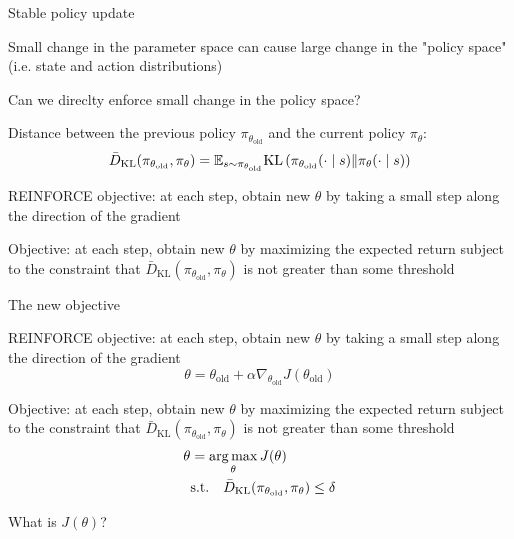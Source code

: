 \documentclass[usenames,dvipsnames,notes,11pt,aspectratio=169,hyperref={colorlinks=true, linkcolor=blue}]{beamer}
\begin{document}
\begin{frame}
    {Stable policy update}
    \begin{wideitemize}[<+->]
        \item Small change in the parameter space can cause large change in the "policy space" (i.e. state and action distributions)
        \item Can we direclty enforce small change in the policy space?
        \item Distance between the previous policy $\pi_{\theta_{\text{old}}}$ and the current policy $\pi_\theta$:
            $$
            \bar{D}_{\text{KL}}(\pi_{\theta_\text{old}}, \pi_\theta) =
            \mathbb{E}_{s\sim \pi_{\theta_\text{old}}}\text{KL}\left( \pi_{\theta_\text{old}}(\cdot\mid s) \| \pi_{\theta}(\cdot\mid s) \right)
            $$
        \item REINFORCE objective: at each step, obtain new $\theta$ by taking a small step along the direction of the gradient
        \item Objective: at each step, obtain new $\theta$ by maximizing the expected return subject to the constraint that $\bar{D}_{\text{KL}}(\pi_{\theta_\text{old}}, \pi_\theta)$ is not greater than some threshold
    \end{wideitemize}
\end{frame}

\begin{frame}
    {The new objective}
    \begin{wideitemize}[<+->]
        \item REINFORCE objective: at each step, obtain new $\theta$ by taking a small step along the direction of the gradient
            $$
            \theta = \theta_{\text{old}} + \alpha \nabla_{\theta_{\text{old}}} J(\theta_{\text{old}})
            $$
        \item Objective: at each step, obtain new $\theta$ by maximizing the expected return subject to the constraint that $\bar{D}_{\text{KL}}(\pi_{\theta_\text{old}}, \pi_\theta)$ is not greater than some threshold
            \begin{align*}
            \theta &= \operatorname*{arg\,max}_\theta J(\theta) \\
                &\text{s.t.} \quad \bar{D}_{\text{KL}}(\pi_{\theta_\text{old}}, \pi_\theta) \le \delta
            \end{align*}
        \item What is $J(\theta)$? 
    \end{wideitemize}
\end{frame}
\end{document}
